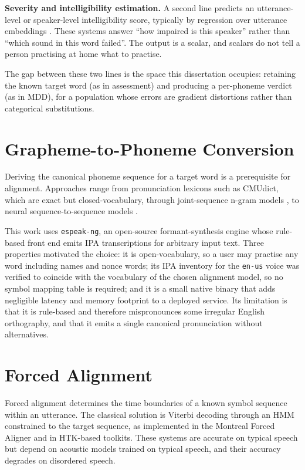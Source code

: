 \textbf{Severity and intelligibility estimation.} A second line predicts an
utterance-level or speaker-level intelligibility score, typically by regression
over utterance embeddings \cite{janbakhshi2019pathological}. These systems
answer ``how impaired is this speaker'' rather than ``which sound in this word
failed''. The output is a scalar, and scalars do not tell a person practising
at home what to practise.

The gap between these two lines is the space this dissertation occupies:
retaining the known target word (as in assessment) and producing a per-phoneme
verdict (as in MDD), for a population whose errors are gradient distortions
rather than categorical substitutions.

\section{Grapheme-to-Phoneme Conversion}
\label{sec:lit-g2p}

Deriving the canonical phoneme sequence for a target word is a prerequisite for
alignment. Approaches range from pronunciation lexicons such as CMUdict, which
are exact but closed-vocabulary, through joint-sequence n-gram models
\cite{bisani2008joint}, to neural sequence-to-sequence models
\cite{yao2015sequence}.

This work uses \texttt{espeak-ng}, an open-source formant-synthesis engine whose
rule-based front end emits IPA transcriptions for arbitrary input text. Three
properties motivated the choice: it is open-vocabulary, so a user may practise
any word including names and nonce words; its IPA inventory for the
\texttt{en-us} voice was verified to coincide with the vocabulary of the chosen
alignment model, so no symbol mapping table is required; and it is a small
native binary that adds negligible latency and memory footprint to a deployed
service. Its limitation is that it is rule-based and therefore mispronounces
some irregular English orthography, and that it emits a single canonical
pronunciation without alternatives.

\section{Forced Alignment}
\label{sec:lit-alignment}

Forced alignment determines the time boundaries of a known symbol sequence
within an utterance. The classical solution is Viterbi decoding through an
HMM constrained to the target sequence, as implemented in the Montreal Forced
Aligner \cite{mcauliffe2017montreal} and in HTK-based toolkits. These systems
are accurate on typical speech but depend on acoustic models trained on typical
speech, and their accuracy degrades on disordered speech.

